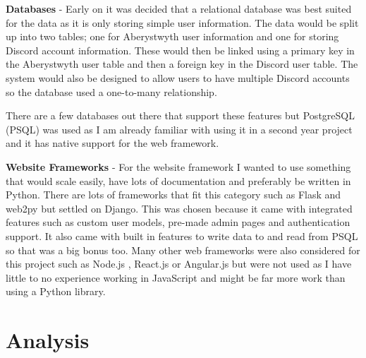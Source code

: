 \textbf{Databases} - Early on it was decided that a relational database was best suited for the data as it is only storing simple user information. The data would be split up into two tables; one for Aberystwyth user information and one for storing Discord account information. These would then be linked using a primary key in the Aberystwyth user table and then a foreign key in the Discord user table. The system would also be designed to allow users to have multiple Discord accounts so the database used a one-to-many relationship. 

There are a few databases out there that support these features but PostgreSQL (PSQL) \cite{psql} was used as I am already familiar with using it in a second year project and it has native support for the web framework.

\textbf{Website Frameworks} - For the website framework I wanted to use something that would scale easily, have lots of documentation and preferably be written in Python. There are lots of frameworks that fit this category such as Flask and web2py but settled on Django. This was chosen because it came with integrated features such as custom user models, pre-made admin pages and authentication support. It also came with built in features to write data to and read from PSQL \cite{psql} so that was a big bonus too. Many other web frameworks were also considered for this project such as Node.js \cite{node.js}, React.js \cite{react.js} or Angular.js \cite{angular.js} but were not used as I have little to no experience working in JavaScript and might be far more work than using a Python library.


\section{Analysis}
%
%
%

